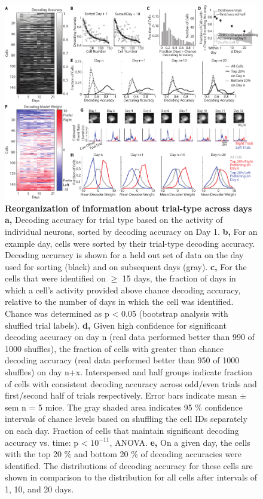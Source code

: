 \begin{figure}
\includegraphics[width=\textwidth]{figures/3_all_new.pdf}
\caption[Reorganization of information about trial-type across days]{\textbf{Reorganization of information about trial-type across days a,} Decoding accuracy for trial type based on the activity of individual neurons, sorted by decoding accuracy on Day 1. 
%
\textbf{b,} For an example day, cells were sorted by their trial-type decoding accuracy. Decoding accuracy is shown for a held out set of data on the day used for sorting (black) and on subsequent days (gray). 
%
\textbf{c,} For the cells that were identified on $\ge$ 15 days, the fraction of days in which a cell's activity provided above chance decoding accuracy, relative to the number of days in which the cell was identified. Chance was determined as p < 0.05 (bootstrap analysis with shuffled trial labels). 
%
\textbf{d,} Given high confidence for significant decoding accuracy on day n (real data performed better than 990 of 1000 shuffles), the fraction of cells with greater than chance decoding accuracy (real data performed better than 950 of 1000 shuffles) on day n+x. Interspersed and half groups indicate fraction of cells with consistent decoding accuracy across odd/even trials and first/second half of trials respectively. Error bars indicate mean $\pm$ sem n = 5 mice. The gray shaded area indicates 95 $\%$ confidence intervals of chance levels based on shuffling the cell IDs separately on each day. Fraction of cells that maintain significant decoding accuracy vs. time: p < $10^{-11}$, ANOVA.
%
\textbf{e,}  On a given day, the cells with the top 20 $\%$ and bottom 20 $\%$ of decoding accuracies were identified. The distributions of decoding accuracy for these cells are shown in comparison to the distribution for all cells after intervals of 1, 10, and 20 days.
}
\end{figure}
